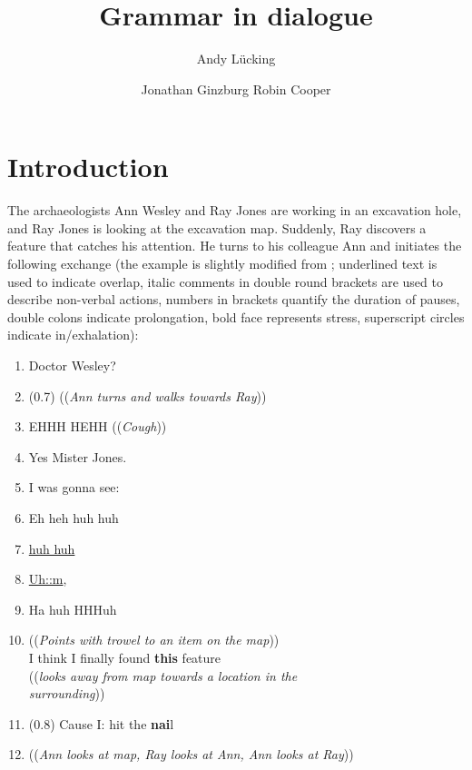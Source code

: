 \documentclass[output=paper
 	        ,biblatex
                ,babelshorthands
                ,newtxmath
                ,draftmode
                ,colorlinks, citecolor=brown
]{langscibook}
\author{%
	Andy Lücking\affiliation{Université de Paris, Goethe-Universität Frankfurt}%
	\and Jonathan Ginzburg\affiliation{Université de Paris}%
	\lastand Robin Cooper\affiliation{Göteborgs Universitet}%
}
\title{Grammar in dialogue}
\begin{document}
\maketitle
\label{chap-pragmatics}



\section{Introduction} 
\label{sec:introduction}

The archaeologists Ann Wesley and Ray Jones are working in an excavation hole, and Ray Jones is looking at the excavation map.
%
Suddenly, Ray discovers a feature that catches his attention. %
He turns to his colleague Ann and initiates the following exchange (the example is slightly modified from ; underlined text is used to indicate overlap, italic comments in double round brackets are used to describe non-verbal actions, numbers in brackets quantify the duration of pauses, double colons indicate prolongation, bold face represents stress, superscript circles indicate in/exhalation):
%
\ea \label{ex:ann-ray}
\begin{enumerate}[noitemsep]
    \item {} Doctor Wesley?
    \item \speaking{} \quad (0.7) ((\textit{Ann turns and walks towards Ray}))
    \item {} EHHH HEHH ((\textit{Cough}))
    \item \speaking{} Yes Mister Jones.
    \item {} I was gonna see:
    \item {} \textdegree Eh heh huh huh
    \item \speaking{}  \underline{huh huh}
    \item {}  \underline{Uh::m},
    \item {} Ha huh HHHuh
    \item {} ((\textit{Points with trowel to an item on the map})) \\ 
    \speaking{} I think I finally found \textbf{this} feature \\
    \speaking{} ((\textit{looks away from map towards a location in the}\\ \speaking{} \textit{surrounding}))
    \item \speaking{} (0.8) Cause I: hit the \textbf{nai}l
    \item ((\textit{Ann looks at map, Ray looks at Ann, Ann looks at Ray}))
\end{enumerate}
\z
\end{document}

